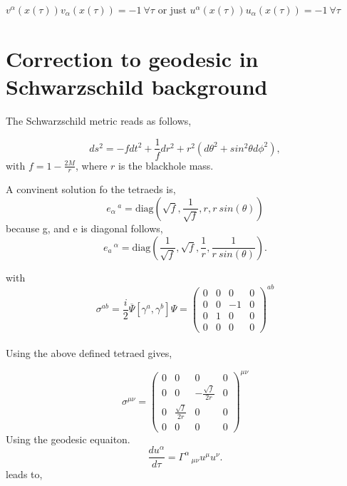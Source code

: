 \documentclass[12pt,a4paper]{article}
\begin{document}
	\color{blue} $v^\alpha(x(\tau))v_\alpha(x(\tau)) = -1 \  \forall  \tau$ \color{black} or just \color{orange} $u^\alpha(x(\tau))u_\alpha(x(\tau)) = -1 \  \forall  \tau$

	\color{black}
	
	\section{Correction to geodesic in Schwarzschild background}
	The Schwarzschild metric reads as follows,
	
	$$
	ds^2 = -f dt^2 + \frac{1}{f} dr^2 + r^2 \left( d \theta^2 + sin^2\theta d\phi^2 \right),
	$$
	with $f = 1 - \frac{2M}{r}$, where $r$ is the blackhole mass.
	
	A convinent solution fo the tetraeds is, 
	$$ e_{\alpha}\,^{a} = \text{diag}\left( \sqrt{f}, \frac{1}{\sqrt{f}}, r , r \ sin(\theta) \right)$$
	because g, and e is diagonal follows, 
	$$ e_{a}\,^{\alpha} = \text{diag}\left( \frac{1}{\sqrt{f}}, \sqrt{f}, \frac{1}{r} , \frac{1}{r \ sin(\theta)} \right).$$
		

	
	with 
		$$
	\sigma^{a b} = \frac{i}{2} \overbar{\Psi}[\gamma^a,\gamma^b]\Psi = \left(\begin{matrix}0 & 0 & 0 & 0\\0 & 0 & - 1 & 0\\0 & 1 & 0 & 0\\0 & 0 & 0 & 0\end{matrix}\right)^{ab}
	$$\\
	
	Using the above defined tetraed gives,
	
	$$
	\sigma^{\mu \nu} = \left(\begin{matrix}0 & 0 & 0 & 0\\0 & 0 & - \frac{\sqrt{f}}{2 r} & 0\\0 & \frac{\sqrt{f}}{2 r} & 0 & 0\\0 & 0 & 0 & 0\end{matrix}\right)^{\mu \nu}
	$$
	Using the geodesic equaiton.
	$$
	\frac{du^\alpha}{d \tau} = \Gamma^{\alpha}\,_{\mu \nu}u^\mu u^\nu.
	$$
	leads to,
	
\end{document}

